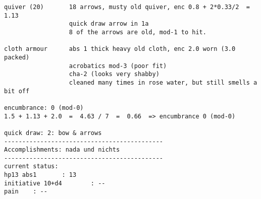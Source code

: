 \begin{samepage}
\begin{verbatim}
quiver (20)       18 arrows, musty old quiver, enc 0.8 + 2*0.33/2  = 1.13
                  quick draw arrow in 1a
                  8 of the arrows are old, mod-1 to hit.

cloth armour      abs 1 thick heavy old cloth, enc 2.0 worn (3.0 packed)
                  acrobatics mod-3 (poor fit)
                  cha-2 (looks very shabby)
                  cleaned many times in rose water, but still smells a bit off

encumbrance: 0 (mod-0)
1.5 + 1.13 + 2.0  =  4.63 / 7  =  0.66  => encumbrance 0 (mod-0)

quick draw: 2: bow & arrows
--------------------------------------------
Accomplishments: nada und nichts
--------------------------------------------
current status:
hp13 abs1       : 13
initiative 10+d4        : --
pain    : --
\end{verbatim} \end{samepage} \normalsize


\

